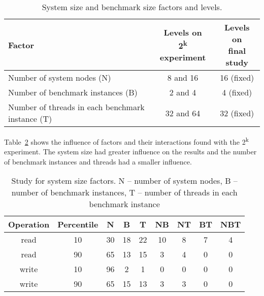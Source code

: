\documentclass[man,floatsintext,12pt]{apa6}
\begin{document}
\begin{table}[h!]
\caption{System size and benchmark size factors and levels.}
\label{tab:system_size_and_benchmark_size_factors}
\begin{tabular}{lcc} \toprule

Factor & \thead{Levels on \\ 2\textsuperscript{k} experiment} & \thead{Levels on \\final study} \\ \midrule

Number of system nodes (N) & 8 and 16 & 16 (fixed) \\

Number of benchmark instances (B) & 2 and 4 & 4 (fixed) \\

Number of threads in each benchmark instance (T) & 32 and 64 & 32 (fixed) \\ \bottomrule

\end{tabular}
\end{table}

Table~\ref{tab:estudo_para_fatores_de_tamanho_do_sistema} shows the influence
of factors and their interactions found with the 2\textsuperscript{k}
experiment. The system size had greater influence on the results and the
number of benchmark instances and threads had a smaller influence.

\begin{table}[h!]
  \caption{Study for system size factors. N -- number of system nodes, B --
number of benchmark instances, T -- number of threads in each benchmark
instance}
  \label{tab:estudo_para_fatores_de_tamanho_do_sistema}
  \begin{tabular}{ccccccccc}         \toprule
  Operation & Percentile & N & B & T & NB & NT & BT & NBT\\ \midrule

  read & 10 & 30 & 18 & 22 & 10 & 8 & 7 & 4 \\

  read & 90 & 65 & 13 & 15 & 3 & 4 & 0 & 0 \\

  write & 10 & 96 & 2 & 1 & 0 & 0 & 0 & 0 \\

  write & 90 & 65 & 15 & 13 & 3 & 3 & 0 & 0 \\ \bottomrule
  \end{tabular}
\end{table}
\end{document}
